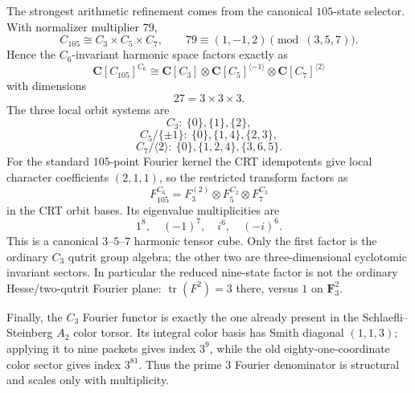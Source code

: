 The strongest arithmetic refinement comes from the canonical $105$-state
selector.  With normalizer multiplier $79$,
\[
 C_{105}\cong C_3\times C_5\times C_7,
 \qquad79\equiv(1,-1,2)\pmod{(3,5,7)}.
\]
Hence the $C_6$-invariant harmonic space factors exactly as
\[
 \boxed{
 \mathbf C[C_{105}]^{C_6}
 \cong
 \mathbf C[C_3]\otimes
 \mathbf C[C_5]^{\langle-1\rangle}\otimes
 \mathbf C[C_7]^{\langle2\rangle}}
\]
with dimensions
\[
 \boxed{27=3\times3\times3}.
\]
The three local orbit systems are
\[
 C_3:\ \{0\},\{1\},\{2\},
\]
\[
 C_5/\{\pm1\}:\ \{0\},\{1,4\},\{2,3\},
\]
\[
 C_7/\langle2\rangle:\ \{0\},\{1,2,4\},\{3,6,5\}.
\]
For the standard $105$-point Fourier kernel the CRT idempotents give local
character coefficients $(2,1,1)$, so the restricted transform factors as
\[
 \boxed{F_{105}^{C_6}=F_3^{(2)}\otimes F_5^{C_2}\otimes F_7^{C_3}}
\]
in the CRT orbit bases.  Its eigenvalue multiplicities are
\[
 1^8,\quad(-1)^7,\quad i^6,\quad(-i)^6.
\]
This is a canonical $3$--$5$--$7$ harmonic tensor cube.  Only the first factor
is the ordinary $C_3$ qutrit group algebra; the other two are three-dimensional
cyclotomic invariant sectors.  In particular the reduced nine-state factor is
not the ordinary Hesse/two-qutrit Fourier plane: $\operatorname{tr}(F^2)=3$
there, versus $1$ on $\mathbf F_3^2$.

Finally, the $C_3$ Fourier functor is exactly the one already present in the
Schlaefli--Steinberg $A_2$ color torsor.  Its integral color basis has Smith
diagonal $(1,1,3)$; applying it to nine packets gives index $3^9$, while the
old eighty-one-coordinate color sector gives index $3^{81}$.  Thus the prime
$3$ Fourier denominator is structural and scales only with multiplicity.
